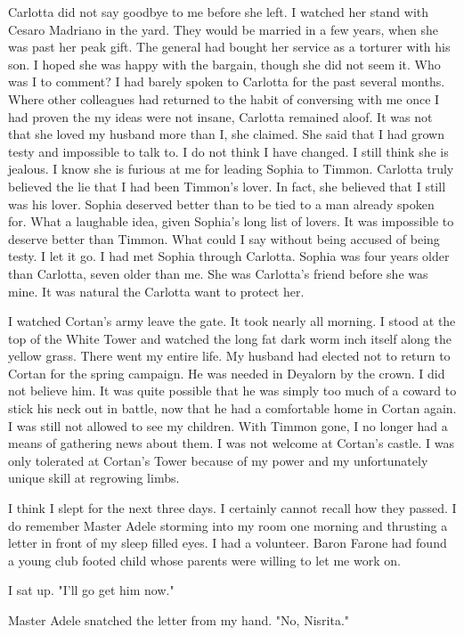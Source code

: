 \documentclass{article}
\begin{document}
Carlotta did not say goodbye to me before she left. I watched her stand with Cesaro Madriano in the yard. They would be married in a few years, when she was past her peak gift. The general had bought her service as a torturer with his son. I hoped she was happy with the bargain, though she did not seem it. Who was I to comment? I had barely spoken to Carlotta for the past several months. Where other colleagues had returned to the habit of conversing with me once I had proven the my ideas were not insane, Carlotta remained aloof. It was not that she loved my husband more than I, she claimed. She said that I had grown testy and impossible to talk to. I do not think I have changed. I still think she is jealous. I know she is furious at me for leading Sophia to Timmon. Carlotta truly believed the lie that I had been Timmon's lover. In fact, she believed that I still was his lover. Sophia deserved better than to be tied to a man already spoken for. What a laughable idea, given Sophia's long list of lovers. It was impossible to deserve better than Timmon. What could I say without being accused of being testy. I let it go. I had met Sophia through Carlotta. Sophia was four years older than Carlotta, seven older than me. She was Carlotta's friend before she was mine. It was natural the Carlotta want to protect her.

I watched Cortan's army leave the gate. It took nearly all morning. I stood at the top of the White Tower and watched the long fat dark worm inch itself along the yellow grass. There went my entire life. My husband had elected not to return to Cortan for the spring campaign. He was needed in Deyalorn by the crown. I did not believe him. It was quite possible that he was simply too much of a coward to stick his neck out in battle, now that he had a comfortable home in Cortan again. I was still not allowed to see my children. With Timmon gone, I no longer had a means of gathering news about them. I was not welcome at Cortan's castle. I was only tolerated at Cortan's Tower because of my power and my unfortunately unique skill at regrowing limbs.

I think I slept for the next three days. I certainly cannot recall how they passed. I do remember Master Adele storming into my room one morning and thrusting a letter in front of my sleep filled eyes. I had a volunteer. Baron Farone had found a young club footed child whose parents were willing to let me work on. 

I sat up. "I'll go get him now."

Master Adele snatched the letter from my hand. "No, Nisrita."
\end{document}
